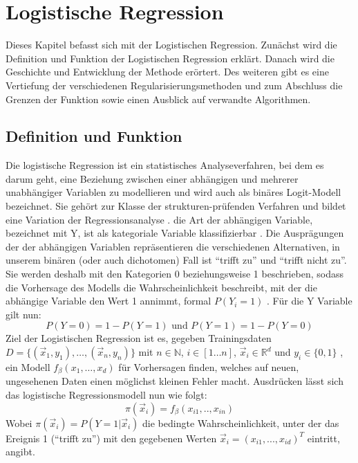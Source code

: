 \chapter{Logistische Regression}
Dieses Kapitel befasst sich mit der Logistischen Regression. Zunächst wird die Definition und Funktion der Logistischen Regression erklärt. Danach wird die Geschichte und Entwicklung der Methode erörtert. Des weiteren gibt es eine Vertiefung der verschiedenen Regularisierungsmethoden und zum Abschluss die Grenzen der Funktion sowie einen Ausblick auf verwandte Algorithmen.
\section{Definition und Funktion}
Die logistische Regression ist ein statistisches Analyseverfahren, bei dem es darum geht, eine Beziehung zwischen einer abhängigen und mehrerer unabhängiger Variablen zu modellieren und wird auch als binäres Logit-Modell bezeichnet. Sie gehört zur Klasse der strukturen-prüfenden Verfahren und bildet eine Variation der Regressionsanalyse \cite{BECK}.
die Art der abhängigen Variable, bezeichnet mit Y, ist als kategoriale Variable klassifizierbar \cite{ROHR}. Die Ausprägungen der der abhängigen Variablen repräsentieren die verschiedenen Alternativen, in unserem binären (oder auch dichotomen) Fall ist "`trifft zu"' und "`trifft nicht zu"'. Sie werden deshalb mit den Kategorien 0 beziehungsweise 1 beschrieben, sodass die Vorhersage des Modells die Wahrscheinlichkeit beschreibt, mit der die abhängige Variable den Wert 1 annimmt, formal $P(Y_i=1)$ \cite{BECK}.
Für die Y Variable gilt nun: 
\begin{displaymath}
P(Y=0)=1-P(Y=1)\text{ und } P(Y=1)=1-P(Y=0)
\end{displaymath}
Ziel der Logistischen Regression ist es, gegeben Trainingsdaten 
$D = \{(\vec x_1 , y_1), \dots , (\vec x_n ,y_n)\}$ mit $n \in 	\mathbb{N}$, $i \in [1 \dots n] $, $\vec x_i \in \mathbb R^d$ und $y_i \in 
\{0,1\}$ , ein Modell $f_{\beta}(x_1, \dots ,x_d)$ für Vorhersagen finden, 
welches auf neuen, ungesehenen Daten einen möglichst kleinen Fehler macht.
Ausdrücken lässt sich das logistische Regressionsmodell nun wie folgt:
\begin{displaymath}
\pi(\vec x_i) = f_{\beta}(x_{i1},..,x_{in})
\end{displaymath}
Wobei $\pi(\vec x_i)=P(Y=1|\vec x_i)$ die bedingte Wahrscheinlichkeit, unter der das Ereignis 1 ("`trifft zu"') mit den gegebenen Werten $\vec x_i = (x_{i1},...,x_{id})^{T}$ eintritt, angibt.\\
